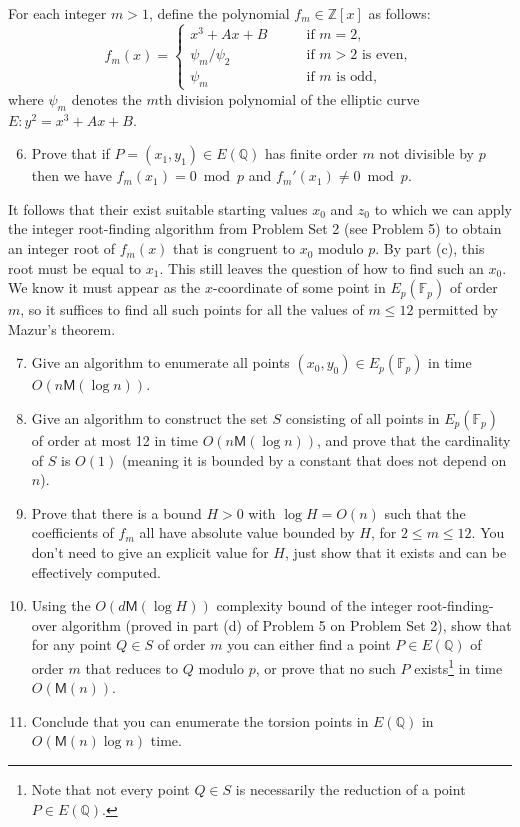 \documentclass[11pt]{article}
\newcommand{\Fp}{\mathbb{F}_p}
\newcommand{\Q}{\mathbb{Q}}
\newcommand{\Z}{\mathbb{Z}}
\newcommand{\M}{\textsf{M}}
\begin{document}
For each integer $m>1$, define the polynomial $f_m\in\Z[x]$ as follows:
\[
f_m(x) = \begin{cases}
x^3+Ax+B\qquad&\text{if $m=2$},\\
\psi_m/\psi_2 &\text{if $m>2$ is even},\\
\psi_m & \text{if $m$ is odd},
\end{cases}
\]
where $\psi_m$ denotes the $m$th division polynomial of  the elliptic curve $E\colon y^2=x^3+Ax+B$.

\begin{enumerate}[{\bf (a)}]
\setcounter{enumi}{5}
\item Prove that if $P=(x_1,y_1)\in E(\Q)$ has finite order $m$ not divisible by $p$ then we have $f_m(x_1)=0\bmod p$ and $f_m'(x_1)\ne 0\bmod p$.
\end{enumerate}

It follows that their exist suitable starting values $x_0$ and $z_0$ to which we can apply the integer root-finding algorithm from Problem Set 2 (see Problem 5) to obtain an integer root of $f_m(x)$ that is congruent to $x_0$ modulo $p$.
By part (c), this root must be equal to $x_1$.
This still leaves the question of how to find such an $x_0$.
We know it must appear as the $x$-coordinate of some point in $E_p(\Fp)$ of order $m$, so it suffices to find all such points for all the values of $m\le 12$ permitted by Mazur's theorem.

\begin{enumerate}[{\bf (a)}]
\setcounter{enumi}{6}
\item Give an algorithm to enumerate all points $(x_0,y_0)\in E_p(\Fp)$ in time $O(n\M(\log n))$.

\item Give an algorithm to construct the set $S$ consisting of all points in $E_p(\Fp)$ of order at most 12 in time $O(n\M(\log n))$, and prove that the cardinality of $S$ is $O(1)$ (meaning it is bounded by a constant that does not depend on $n$).

\item Prove that there is a bound $H>0$ with $\log H=O(n)$ such that the coefficients of $f_m$ all have absolute value bounded by $H$, for $2\le m\le 12$.
You don't need to give an explicit value for $H$, just show that it exists and can be effectively computed.

\item Using the $O(d\M(\log H))$ complexity bound of the integer root-finding-over algorithm (proved in part (d) of Problem 5 on Problem Set 2), show that for any point $Q\in S$ of order $m$ you can either find a point $P\in E(\Q)$ of order $m$ that reduces to $Q$ modulo $p$, or prove that no such $P$ exists\footnote{Note that not every point $Q\in S$ is necessarily the reduction of a point $P\in E(\Q)$.} in time $O(\M(n))$.

\item Conclude that you can enumerate the torsion points in $E(\Q)$ in $O(\M(n)\log n)$ time.
\end{enumerate}
\end{document}
